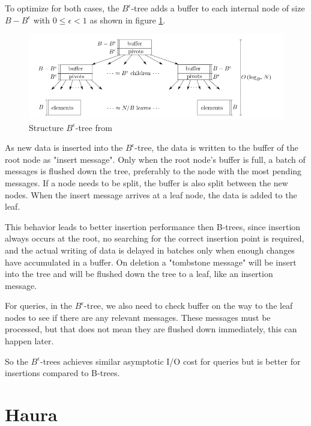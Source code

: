 \documentclass[
	12pt,
	a4paper,
	abstract,
	bibliography=totoc,
	chapterprefix,
	headings=openright,
	numbers=endperiod,
	parskip=half,
	twoside,
]{scrreprt}
\begin{document}
To optimize for both cases, the $B^{\epsilon}$-tree adds a buffer to each internal node of size $B - B^{\epsilon} $ with $ 0 \leq \epsilon < 1$ as shown in figure \ref{fig:structure B-epsilon-tree}.

\begin{figure}[ht]
	\centering
	\includegraphics[scale=0.6]{B-epsilon_structure.png}
	\caption{Structure $B^{\epsilon}$-tree from \cite{bender2015introduction}}
		\label{fig:structure B-epsilon-tree}
\end{figure}

As new data is inserted into the $B^{\epsilon}$-tree, the data is written to the buffer of the root node as "insert message".
Only when the root node's buffer is full, a batch of messages is flushed down the tree, preferably to the node with the most pending messages. 
If a node needs to be split, the buffer is also split between the new nodes.
When the insert message arrives at a leaf node, the data is added to the leaf.

This behavior leads to better insertion performance then B-trees, since insertion always occurs at the root, no searching for the correct insertion point is required, and  
the actual writing of data is delayed in batches only when enough changes have accumulated in a buffer.
On deletion a "tombstone message" will be insert into the tree and will be flushed down the tree to a leaf, like an insertion message.

For queries, in the $B^{\epsilon}$-tree, we also need to check buffer on the way to the leaf nodes to see if there are any relevant messages.
These messages must be processed, but that does not mean they are flushed down immediately, this can happen later.

So the $B^{\epsilon}$-trees achieves similar asymptotic I/O cost for queries but is better for insertions compared to B-trees.


\section{Haura}
\end{document}
